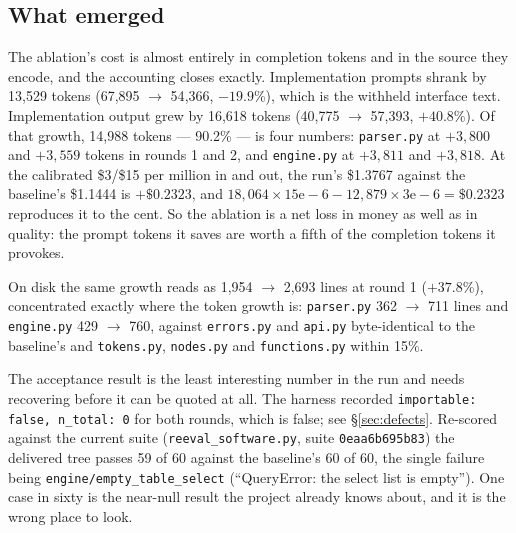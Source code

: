 \documentclass[11pt]{article}
\begin{document}
\subsection{What emerged}

The ablation's cost is almost entirely in completion tokens and in the source they encode, and
the accounting closes exactly. Implementation prompts shrank by 13{,}529 tokens (67{,}895
$\rightarrow$ 54{,}366, $-19.9$\%), which is the withheld interface text. Implementation output
grew by 16{,}618 tokens (40{,}775 $\rightarrow$ 57{,}393, $+40.8$\%). Of that growth, 14{,}988
tokens --- 90.2\% --- is four numbers: \texttt{parser.py} at $+3{,}800$ and $+3{,}559$ tokens
in rounds 1 and 2, and \texttt{engine.py} at $+3{,}811$ and $+3{,}818$. At the calibrated
\$3/\$15 per million in and out, the run's \$1.3767 against the baseline's \$1.1444 is
$+\$0.2323$, and $18{,}064\times15\mathrm{e}{-}6 - 12{,}879\times3\mathrm{e}{-}6 = \$0.2323$
reproduces it to the cent. So the ablation is a net loss in money as well as in quality: the
prompt tokens it saves are worth a fifth of the completion tokens it provokes.

On disk the same growth reads as 1{,}954 $\rightarrow$ 2{,}693 lines at round 1 ($+37.8$\%),
concentrated exactly where the token growth is: \texttt{parser.py} 362 $\rightarrow$ 711 lines
and \texttt{engine.py} 429 $\rightarrow$ 760, against \texttt{errors.py} and \texttt{api.py}
byte-identical to the baseline's and \texttt{tokens.py}, \texttt{nodes.py} and
\texttt{functions.py} within 15\%.

The acceptance result is the least interesting number in the run and needs recovering before it
can be quoted at all. The harness recorded \texttt{importable: false, n\_total: 0} for both
rounds, which is false; see \S\ref{sec:defects}. Re-scored against the current suite
(\texttt{reeval\_software.py}, suite \texttt{0eaa6b695b83}) the delivered tree passes 59 of 60
against the baseline's 60 of 60, the single failure being \texttt{engine/empty\_table\_select}
(``QueryError: the select list is empty''). One case in sixty is the near-null result the
project already knows about, and it is the wrong place to look.
\end{document}
